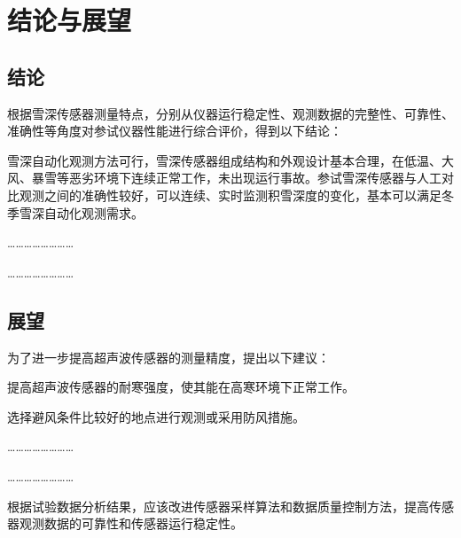 \setcounter{chapter}{4}
\chapter{结论与展望}

\section{结论}

根据雪深传感器测量特点，分别从仪器运行稳定性、观测数据的完整性、可靠性、准确性等角度对参试仪器性能进行综合评价，得到以下结论：

雪深自动化观测方法可行，雪深传感器组成结构和外观设计基本合理，在低温、大风、暴雪等恶劣环境下连续正常工作，未出现运行事故。参试雪深传感器与人工对比观测之间的准确性较好，可以连续、实时监测积雪深度的变化，基本可以满足冬季雪深自动化观测需求。

……………………

……………………

\section{展望}

为了进一步提高超声波传感器的测量精度，提出以下建议：

提高超声波传感器的耐寒强度，使其能在高寒环境下正常工作。

选择避风条件比较好的地点进行观测或采用防风措施。

……………………

……………………

根据试验数据分析结果，应该改进传感器采样算法和数据质量控制方法，提高传感器观测数据的可靠性和传感器运行稳定性。
